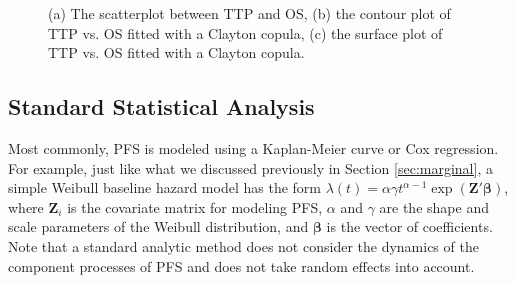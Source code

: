 \begin{figure}
\centering
{}\label{fig:scatter}
\label{fig:contour}
\label{fig:surface}
\caption{(a) The scatterplot between TTP and OS, (b) the contour plot of TTP vs. OS fitted with a Clayton copula, (c) the surface plot of TTP vs. OS fitted with a Clayton copula. \label{fig:copula}}
\end{figure}

\subsection{Standard Statistical Analysis}\label{sec:method_standard}

Most commonly, \ac{PFS} is modeled using a Kaplan-Meier curve or Cox regression. For example, just like what we discussed previously in Section \ref{sec:marginal}, a simple Weibull baseline hazard model has the form
$\lambda(t)=\alpha \gamma t^{\alpha-1} \exp(\textbf{Z}' \boldsymbol{\beta})$,
where $\textbf{Z}_i$ is the covariate matrix for modeling PFS, $\alpha$ and $\gamma$ are the shape and scale parameters of the Weibull distribution, and $\boldsymbol{\beta}$ is the vector of coefficients. Note that a standard analytic method does not consider the dynamics of the component processes of \ac{PFS} and does not take random effects into account.

